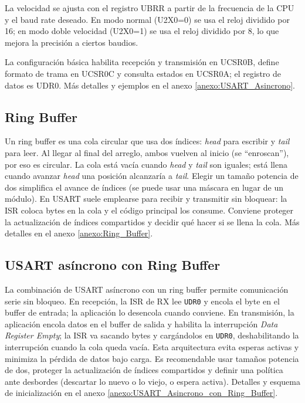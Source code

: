 La velocidad se ajusta con el registro UBRR a partir de la frecuencia de la CPU y el baud rate deseado. En modo normal (U2X0=0) se usa el reloj dividido por 16; en modo doble velocidad (U2X0=1) se usa el reloj dividido por 8, lo que mejora la precisión a ciertos baudios.

La configuración básica habilita recepción y transmisión en UCSR0B, define formato de trama en UCSR0C y consulta estados en UCSR0A; el registro de datos es UDR0. Más detalles y ejemplos en el anexo \ref{anexo:USART_Asincrono}.



\subsection{Ring Buffer}
Un ring buffer es una cola circular que usa dos índices: \textit{head} para escribir y \textit{tail} para leer. Al llegar al final del arreglo, ambos vuelven al inicio (se “enroscan”), por eso es circular. La cola está vacía cuando \textit{head} y \textit{tail} son iguales; está llena cuando avanzar \textit{head} una posición alcanzaría a \textit{tail}. Elegir un tamaño potencia de dos simplifica el avance de índices (se puede usar una máscara en lugar de un módulo). En USART suele emplearse para recibir y transmitir sin bloquear: la ISR coloca bytes en la cola y el código principal los consume. Conviene proteger la actualización de índices compartidos y decidir qué hacer si se llena la cola. Más detalles en el anexo \ref{anexo:Ring_Buffer}.



\subsection{USART asíncrono con Ring Buffer}
La combinación de USART asíncrono con un ring buffer permite comunicación serie sin bloqueo. En recepción, la ISR de RX lee \texttt{UDR0} y encola el byte en el buffer de entrada; la aplicación lo desencola cuando conviene. En transmisión, la aplicación encola datos en el buffer de salida y habilita la interrupción \textit{Data Register Empty}; la ISR va sacando bytes y cargándolos en \texttt{UDR0}, deshabilitando la interrupción cuando la cola queda vacía. Esta arquitectura evita esperas activas y minimiza la pérdida de datos bajo carga. Es recomendable usar tamaños potencia de dos, proteger la actualización de índices compartidos y definir una política ante desbordes (descartar lo nuevo o lo viejo, o espera activa). Detalles y esquema de inicialización en el anexo \ref{anexo:USART_Asincrono_con_Ring_Buffer}.

